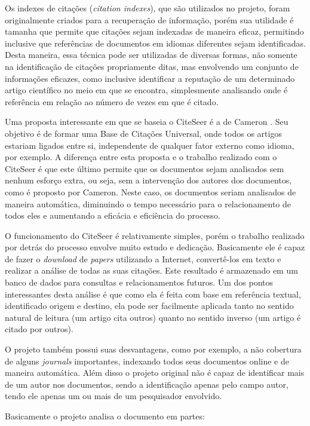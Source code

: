 Os indexes de citações (\textit{citation indexes}), que são utilizados no projeto, foram originalmente criados para a recuperação de informação, porém sua utilidade é tamanha que permite que citações sejam indexadas de maneira eficaz, permitindo inclusive que referências de documentos em idiomas diferentes sejam identificadas. Desta maneira, essa técnica pode ser utilizadas de diversas formas, não somente na identificação de citações propriamente ditas, mas envolvendo um conjunto de informações eficazes, como inclusive identificar a reputação de um determinado artigo científico no meio em que se encontra, simplesmente analisando onde é referência em relação ao número de vezes em que é citado.

Uma proposta interessante em que se baseia o CiteSeer é a de Cameron \cite{cameron}. Seu objetivo é de formar uma Base de Citações Universal, onde todos os artigos estariam ligados entre si, independente de qualquer fator externo como idioma, por exemplo. A diferença entre esta proposta e o trabalho realizado com o CiteSeer é que este último permite que os documentos sejam analisados sem nenhum esforço extra, ou seja, sem a intervenção dos autores dos documentos, como é proposto por Cameron. Neste caso, os documentos seriam analisados de maneira automática, diminuindo o tempo necessário para o relacionamento de todos eles e aumentando a eficácia e eficiência do processo.

O funcionamento do CiteSeer é relativamente simples, porém o trabalho realizado por detrás do processo envolve muito estudo e dedicação. Basicamente ele é capaz de fazer o \textit{download} de \textit{papers} utilizando a Internet, convertê-los em texto e realizar a análise de todas as suas citações. Este resultado é armazenado em um banco de dados para consultas e relacionamentos futuros. Um dos pontos interessantes desta análise é que como ela é feita com base em referência textual, identificado origem e destino, ela pode ser facilmente aplicada tanto no sentido natural de leitura (um artigo cita outros) quanto no sentido inverso (um artigo é citado por outros). 

O projeto também possui suas desvantagens, como por exemplo, a não cobertura de alguns \textit{journals} importantes, indexando todos seus documentos online e de maneira automática. Além disso o projeto original não é capaz de identificar mais de um autor nos documentos, sendo a identificação apenas pelo campo autor, tendo ele apenas um ou mais de um pesquisador envolvido.

Basicamente o projeto analisa o documento em partes:

